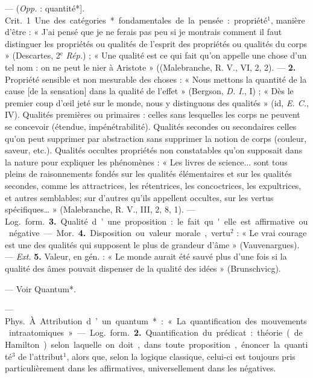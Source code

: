 
	\begin{itemize}[leftmargin=1cm, label=, itemsep=1pt]

 — ({\it Opp.} : quantité*]. \si{Crit.}
1. Une des catégories* fondamentales de la pensée : propriété$^1$, manière d’être : « J’ai pensé que je ne
ferais pas peu si je montrais comment il faut distinguer les propriétés ou qualités de l'esprit des propriétés ou qualités du corps » (Descartes, 2$^\text{e}$ {\it Rép.}) ; « Une qualité est ce
qui fait qu'on appelle une chose
d’un tel nom : on ne peut le nier à
Aristote » ((Malebranche, R. V.,
VI, 2, 2). — {\bf 2.} Propriété sensible
et non mesurable des choses : « Nous
mettons la quantité de la cause [de
la sensation] dans la qualité de
l'effet » (Bergson, {\it D. I.}, I) ; « Dès le
premier coup d'œil jeté sur le
monde, nous y distinguons des qualités » (id, {\it E. C.}, IV). Qualités premières ou primaires : celles sans lesquelles les corps ne peuvent se concevoir (étendue, impénétrabilité).
Qualités secondes ou secondaires
celles qu'on peut supprimer par
abstraction sans supprimer la notion de corps (couleur, saveur, etc.).
Qualités occultes propriétés non
constatables qu’on supposait dans
la nature pour expliquer les phénomènes : « Les livres de science...
sont tous pleins de raisonnements
fondés sur les qualités élémentaires
et sur les qualités secondes, comme
les attractrices, les rétentrices, les
concoctrices, les expultrices, et autres
semblables; sur d’autres qu'ils appellent occultes, sur les vertus spécifiques… » (Malebranche, R. V., III,
2, 8, 1). — \si{Log.} \si{form.} {\bf 3.} Qualité
d’une proposition : le fait qu'elle est
affirmative ou négative.

— \si{Mor.} {\bf 4.} Disposition ou valeur
morale, vertu$^2$ : « Le vrai courage est
une des qualités qui supposent le
plus de grandeur d'âme » (Vauvenargues). — {\it Ext.} {\bf 5.} Valeur, en
gén. : « Le monde aurait été sauvé
plus d’une fois si la qualité des âmes
pouvait dispenser de la qualité des
idées » (Brunschvicg).

 — Voir Quantum*.

 — \si{Phys.} À. Attribution d’un quantum* : « La quantification des mouvements intraatomiques ». — \si{Log.} \si{form.} {\bf 2.} Quantification du prédicat : théorie (de
Hamilton) selon laquelle on doit,
dans toute proposition, énoncer la
quantité$^3$ de l’attribut$^1$, alors que,
selon la logique classique, celui-ci
est toujours pris particulièrement
dans les affirmatives, universellement dans les négatives.


\end{itemize}
